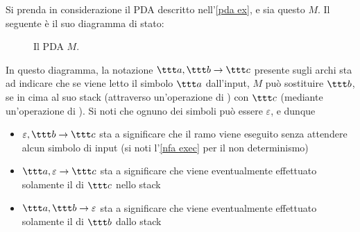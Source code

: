 \documentclass[a4paper, 12pt]{report}
\begin{document}
    \begin{example}
        \label{pda ex 2}
        Si prenda in considerazione il PDA descritto nell'\cref{pda ex}, e sia questo $M$. Il seguente è il suo diagramma di stato:

        \begin{figure}[H]
            \centering
             \caption{Il PDA $M$.}
        \end{figure}

        In questo diagramma, la notazione $\ttt a, \ttt b \to \ttt c$ presente sugli archi sta ad indicare che se viene letto il simbolo $\ttt a$ dall'input, $M$ può sostituire $\ttt b$, se in cima al suo stack (attraverso un'operazione di ) con $\ttt c$ (mediante un'operazione di ). Si noti che ognuno dei simboli può essere $\varepsilon$, e dunque

        \begin{itemize}
            \item $\varepsilon, \ttt b \to \ttt c$ sta a significare che il ramo viene eseguito senza attendere alcun simbolo di input (si noti l'\cref{nfa exec} per il non determinismo)
            \item $\ttt a, \varepsilon \to \ttt c$ sta a significare che viene eventualmente effettuato solamente il  di $\ttt c$ nello stack
            \item $\ttt a, \ttt b \to \varepsilon$ sta a significare che viene eventualmente effettuato solamente il  di $\ttt b$ dallo stack
        \end{itemize}

    \end{example}
\end{document}
